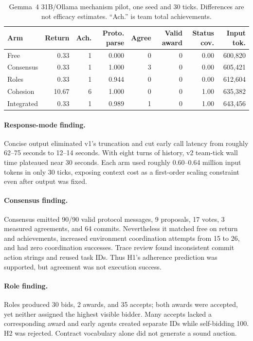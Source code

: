 \documentclass[11pt]{article}
\begin{document}
\begin{table}[h]
\centering\small
\begin{tabular}{lrrrrrrr}
\toprule
Arm & Return & Ach. & Proto. parse & Agree & Valid award & Status cov. & Input tok.\\
\midrule
Free       & 0.33 & 1 & 0.000 & 0 & 0 & 0.00 & 600,820\\
Consensus  & 0.33 & 1 & 1.000 & 3 & 0 & 0.00 & 605,421\\
Roles      & 0.33 & 1 & 0.944 & 0 & 0 & 0.00 & 612,604\\
Cohesion   &10.67 & 6 & 1.000 & 0 & 0 & 1.00 & 635,382\\
Integrated & 0.33 & 1 & 0.989 & 1 & 0 & 1.00 & 643,456\\
\bottomrule
\end{tabular}
\caption{Gemma~4 31B/Ollama mechanism pilot, one seed and 30 ticks. Differences are not efficacy estimates. ``Ach.'' is team total achievements.}
\label{tab:pilot}
\end{table}

\paragraph{Response-mode finding.} Concise output eliminated v1's truncation and cut early call latency from roughly 62--75 seconds to 12--14 seconds. With eight turns of history, v2 team-tick wall time plateaued near 30 seconds. Each arm used roughly 0.60--0.64 million input tokens in only 30 ticks, exposing context cost as a first-order scaling constraint even after output was fixed.

\paragraph{Consensus finding.} Consensus emitted 90/90 valid protocol messages, 9 proposals, 17 votes, 3 measured agreements, and 64 commits. Nevertheless it matched free on return and achievements, increased environment coordination attempts from 15 to 26, and had zero coordination successes. Trace review found inconsistent commit action strings and reused task IDs. Thus H1's adherence prediction was supported, but agreement was not execution success.

\paragraph{Role finding.} Roles produced 30 bids, 2 awards, and 35 accepts; both awards were accepted, yet neither assigned the highest visible bidder. Many accepts lacked a corresponding award and early agents created separate IDs while self-bidding 100. H2 was rejected. Contract vocabulary alone did not generate a sound auction.
\end{document}

